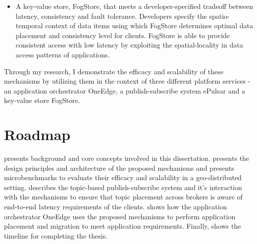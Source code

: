 \begin{itemize}
\item A key-value store, FogStore, that meets a developer-specified tradeoff between latency, consistency and fault tolerance. Developers specify the spatio-temporal context of data items using which FogStore determines optimal data placement and consistency level for clients. FogStore is able to provide consistent access with low latency by exploiting the spatial-locality in data access patterns of applications. 
\end{itemize}

Through my research, I demonstrate the efficacy and scalability of these mechanisms by utilizing them in the context of three different platform services - an application orchestrator OneEdge, a publish-subscribe system ePulsar and a key-value store FogStore.

\section{Roadmap}
 presents background and core concepts involved in this dissertation. 
 presents the design principles and architecture of the proposed mechanisms and presents microbenchmarks to evaluate their efficacy and scalability in a geo-distributed setting. 
 describes the topic-based publish-subscribe system \epulsar and it's interaction with the mechanisms to ensure that topic placement across brokers is aware of end-to-end latency requirements of the clients.  shows how the application orchestrator OneEdge uses the proposed mechanisms to perform application placement and migration to meet application requirements. Finally,  shows the timeline for completing the thesis.